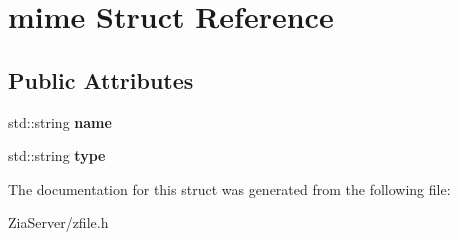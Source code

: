 \hypertarget{structmime}{
\section{mime Struct Reference}
\label{structmime}
}
\subsection*{Public Attributes}
\begin{DoxyCompactItemize}
\item 
\hypertarget{structmime_a2008e2ca1f2d0f09c41f83b37cef9754}{
std::string {\bfseries name}}
\label{structmime_a2008e2ca1f2d0f09c41f83b37cef9754}

\item 
\hypertarget{structmime_a87554d0aba281e598a0082abcc61d889}{
std::string {\bfseries type}}
\label{structmime_a87554d0aba281e598a0082abcc61d889}

\end{DoxyCompactItemize}


The documentation for this struct was generated from the following file:\begin{DoxyCompactItemize}
\item 
ZiaServer/zfile.h\end{DoxyCompactItemize}

